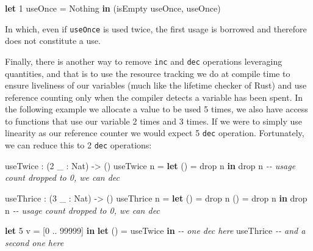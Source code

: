 \documentclass[
]{article}
\newenvironment{Shaded}{}{}
\newcommand{\CommentTok}[1]{\textcolor[rgb]{0.38,0.63,0.69}{\textit{#1}}}
\newcommand{\DataTypeTok}[1]{\textcolor[rgb]{0.56,0.13,0.00}{#1}}
\newcommand{\DecValTok}[1]{\textcolor[rgb]{0.25,0.63,0.44}{#1}}
\newcommand{\FunctionTok}[1]{\textcolor[rgb]{0.02,0.16,0.49}{#1}}
\newcommand{\KeywordTok}[1]{\textcolor[rgb]{0.00,0.44,0.13}{\textbf{#1}}}
\newcommand{\NormalTok}[1]{#1}
\newcommand{\OperatorTok}[1]{\textcolor[rgb]{0.40,0.40,0.40}{#1}}
\newcommand{\OtherTok}[1]{\textcolor[rgb]{0.00,0.44,0.13}{#1}}
\begin{document}
\begin{Shaded}
\begin{Highlighting}[]
\KeywordTok{let} \DecValTok{1}\NormalTok{ useOnce }\OtherTok{=} \DataTypeTok{Nothing} \KeywordTok{in}
\NormalTok{    (isEmpty useOnce, useOnce)}
\end{Highlighting}
\end{Shaded}

In which, even if \texttt{useOnce} is used twice, the first usage is
borrowed and therefore does not constitute a use.

Finally, there is another way to remove \texttt{inc} and \texttt{dec}
operations leveraging quantities, and that is to use the resource
tracking we do at compile time to ensure liveliness of our variables
(much like the lifetime checker of Rust) and use reference counting only
when the compiler detects a variable has been spent. In the following
example we allocate a value to be used 5 times, we also have access to
functions that use our variable 2 times and 3 times. If we were to
simply use linearity as our reference counter we would expect 5
\texttt{dec} operation. Fortunately, we can reduce this to 2
\texttt{dec} operations:

\begin{Shaded}
\begin{Highlighting}[]
\NormalTok{useTwice }\OperatorTok{:}\NormalTok{ (}\DecValTok{2}\NormalTok{ \_ }\OperatorTok{:} \DataTypeTok{Nat}\NormalTok{) }\OtherTok{{-}\textgreater{}}\NormalTok{ ()}
\NormalTok{useTwice n }\OtherTok{=} \KeywordTok{let}\NormalTok{ () }\OtherTok{=} \FunctionTok{drop}\NormalTok{ n }\KeywordTok{in}
                 \FunctionTok{drop}\NormalTok{ n }\CommentTok{{-}{-} usage count dropped to 0, we can \textasciigrave{}dec\textasciigrave{}}

\NormalTok{useThrice }\OperatorTok{:}\NormalTok{ (}\DecValTok{3}\NormalTok{ \_ }\OperatorTok{:} \DataTypeTok{Nat}\NormalTok{) }\OtherTok{{-}\textgreater{}}\NormalTok{ ()}
\NormalTok{useThrice n }\OtherTok{=} \KeywordTok{let}\NormalTok{ () }\OtherTok{=} \FunctionTok{drop}\NormalTok{ n }
\NormalTok{                  () }\OtherTok{=} \FunctionTok{drop}\NormalTok{ n}
               \KeywordTok{in} \FunctionTok{drop}\NormalTok{ n }\CommentTok{{-}{-} usage count dropped to 0, we can \textasciigrave{}dec\textasciigrave{}}

\KeywordTok{let} \DecValTok{5}\NormalTok{ v }\OtherTok{=}\NormalTok{ [}\DecValTok{0} \OperatorTok{..} \DecValTok{99999}\NormalTok{] }\KeywordTok{in}
\KeywordTok{let}\NormalTok{ () }\OtherTok{=}\NormalTok{ useTwice }\KeywordTok{in} \CommentTok{{-}{-} one \textasciigrave{}dec\textasciigrave{} here}
\NormalTok{    useThrice }\CommentTok{{-}{-} and a second one here}
\end{Highlighting}
\end{Shaded}
\end{document}
